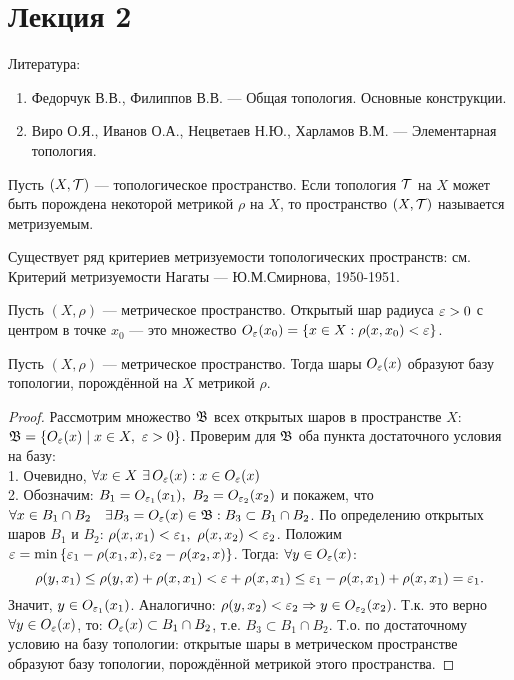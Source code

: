 \section{Лекция 2}

Литература:
\begin{enumerate}
    \item Федорчук В.В., Филиппов В.В. --- Общая топология. Основные конструкции.
    \item Виро О.Я., Иванов О.А., Нецветаев Н.Ю., Харламов В.М. --- Элементарная топология.
\end{enumerate}

\begin{definition}
    Пусть $(X, \mathcal{T})$ --- топологическое пространство. Если топология $\mathcal{T}$ на $X$ может быть порождена некоторой метрикой $\rho$ на $X$, то пространство $(X, \mathcal{T})$ называется метризуемым.
\end{definition}

\begin{nota_bene}
    Существует ряд критериев метризуемости топологических пространств: см. Критерий метризуемости Нагаты --- Ю.М.Смирнова, 1950-1951.
\end{nota_bene}

\begin{definition}
    Пусть $(X, \rho)$ --- метрическое пространство. Открытый шар радиуса $\varepsilon > 0$ с центром в точке $x_0$ --- это множество $O_{\varepsilon}(x_0) = \left\{x \in X : \rho(x, x_0) < \varepsilon\right\}$.
\end{definition}

\begin{theorem}\label{T:Base_of_Metric}
    Пусть $(X, \rho)$ --- метрическое пространство. Тогда шары $O_{\varepsilon}(x)$ образуют базу топологии, порождённой на $X$ метрикой $\rho$.
\end{theorem}
\begin{proof}
    Рассмотрим множество $\mathfrak{B}$ всех открытых шаров в пространстве $X$: \quad $\mfB = \cbr{O_{\veps}(x) \mid x \in X, \ \veps > 0}$. Проверим для $\mathfrak{B}$ оба пункта достаточного условия на базу: \\
    1. Очевидно, $\forall x \in X \ \exists \, O_{\varepsilon}(x) : x \in O_{\varepsilon}(x)$ \\
    2. Обозначим: $B_1 = O_{\varepsilon_1}(x_1), \ B_2 = O_{\varepsilon_2}(x_2)$ и покажем, что $\forall x \in B_1 \cap B_2 \quad \exists B_3 = O_{\varepsilon}(x) \in \mathfrak{B}: B_3 \subset B_1 \cap B_2$. По определению открытых шаров $B_1$ и $B_2$:
    $\rho(x, x_1) < \varepsilon_1, \ \rho(x, x_2) < \varepsilon_2$. Положим $\varepsilon = \min\left\{\varepsilon_1 - \rho(x_1, x), \varepsilon_2 - \rho(x_2, x)\right\}$. Тогда: $\forall y \in O_{\varepsilon}(x)$:
    \[
        \rho(y, x_1) \leq \rho(y, x) + \rho(x, x_1) < \varepsilon + \rho(x, x_1) \leq \varepsilon_1 - \rho(x, x_1) + \rho(x, x_1) = \varepsilon_1.
    \]
    Значит, $y \in O_{\varepsilon_1}(x_1)$. Аналогично: $\rho(y, x_2) < \varepsilon_2 \Rightarrow y \in O_{\varepsilon_2}(x_2)$. Т.к. это верно $\forall y \in O_{\varepsilon}(x)$, то: $O_{\varepsilon}(x) \subset B_1 \cap B_2$, т.е. $B_3 \subset B_1 \cap B_2$.
    Т.о. по достаточному условию на базу топологии: открытые шары в метрическом пространстве образуют базу топологии, порождённой метрикой этого пространства.
\end{proof}


